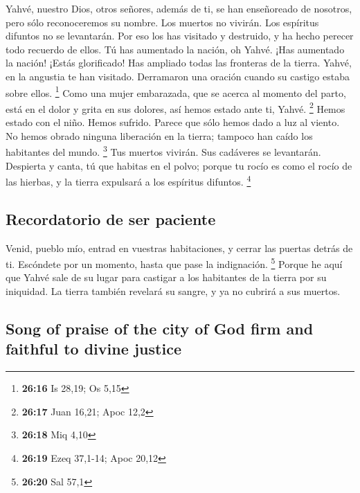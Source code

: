 \begin{paracol}{2}
 Yahvé, nuestro Dios, otros señores, además de ti, se han
enseñoreado de nosotros, pero sólo reconoceremos su nombre.
 Los muertos no vivirán. Los espíritus difuntos no se
levantarán. Por eso los has visitado y destruido, y ha hecho perecer
todo recuerdo de ellos.  Tú has aumentado la nación, oh
Yahvé. ¡Has aumentado la nación! ¡Estás glorificado! Has ampliado todas
las fronteras de la tierra.  Yahvé, en la angustia te han
visitado. Derramaron una oración cuando su castigo estaba sobre ellos.
\footnote{\textbf{26:16} Is 28,19; Os 5,15}  Como una
mujer embarazada, que se acerca al momento del parto, está en el dolor y
grita en sus dolores, así hemos estado ante ti, Yahvé. \footnote{\textbf{26:17}
  Juan 16,21; Apoc 12,2}  Hemos estado con el niño. Hemos
sufrido. Parece que sólo hemos dado a luz al viento. No hemos obrado
ninguna liberación en la tierra; tampoco han caído los habitantes del
mundo. \footnote{\textbf{26:18} Miq 4,10}  Tus muertos
vivirán. Sus cadáveres se levantarán. Despierta y canta, tú que habitas
en el polvo; porque tu rocío es como el rocío de las hierbas, y la
tierra expulsará a los espíritus difuntos. \footnote{\textbf{26:19} Ezeq
  37,1-14; Apoc 20,12}

\hypertarget{recordatorio-de-ser-paciente}{%
\subsection{Recordatorio de ser
paciente}\label{recordatorio-de-ser-paciente}}

 Venid, pueblo mío, entrad en vuestras habitaciones, y
cerrar las puertas detrás de ti. Escóndete por un momento, hasta que
pase la indignación. \footnote{\textbf{26:20} Sal 57,1} 
Porque he aquí que Yahvé sale de su lugar para castigar a los habitantes
de la tierra por su iniquidad. La tierra también revelará su sangre, y
ya no cubrirá a sus muertos.

\switchcolumn
\begin{otherlanguage}{english}

\hypertarget{song-of-praise-of-the-city-of-god-firm-and-faithful-to-divine-justice}{%
\subsection{Song of praise of the city of God firm and faithful to
divine
justice}\label{song-of-praise-of-the-city-of-god-firm-and-faithful-to-divine-justice}}


\end{otherlanguage}
\end{paracol}
